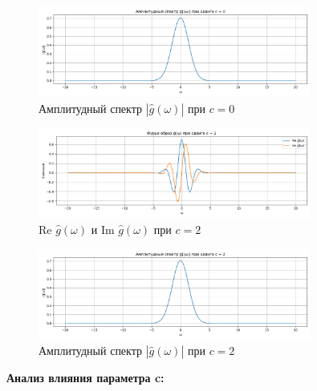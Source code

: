 \begin{figure}[H]
    \centering
    \includegraphics[width=0.8\textwidth]{g_hat_magnitude_c0.png}
    \caption{Амплитудный спектр $|\hat{g}(\omega)|$ при $c = 0$}
\end{figure}

\begin{figure}[H]
    \centering
    \includegraphics[width=0.8\textwidth]{g_hat_complex_c2.png}
    \caption{Re $\hat{g}(\omega)$ и Im $\hat{g}(\omega)$ при $c = 2$}
\end{figure}

\begin{figure}[H]
    \centering
    \includegraphics[width=0.8\textwidth]{g_hat_magnitude_c2.png}
    \caption{Амплитудный спектр $|\hat{g}(\omega)|$ при $c = 2$}
\end{figure}

\textbf{Анализ влияния параметра c:}

